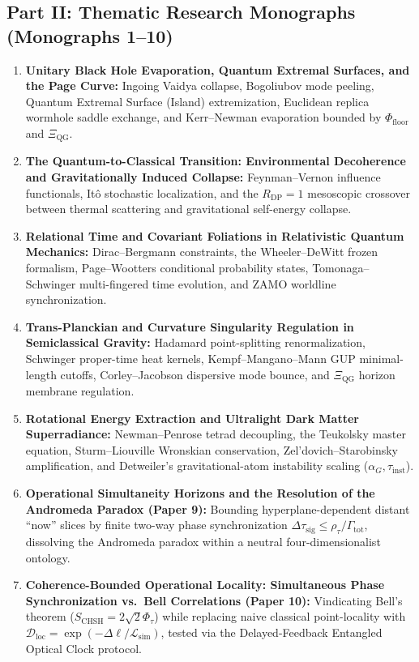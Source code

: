 \documentclass[11pt,a4paper]{article}
\begin{document}
\subsection*{Part II: Thematic Research Monographs (Monographs 1--10)}
\begin{enumerate}[label=\textbf{\arabic*.}]
    \item \textbf{Unitary Black Hole Evaporation, Quantum Extremal Surfaces, and the Page Curve:} Ingoing Vaidya collapse, Bogoliubov mode peeling, Quantum Extremal Surface (Island) extremization, Euclidean replica wormhole saddle exchange, and Kerr--Newman evaporation bounded by $\Phi_{\mathrm{floor}}$ and $\Xi_{\mathrm{QG}}$.
    \item \textbf{The Quantum-to-Classical Transition: Environmental Decoherence and Gravitationally Induced Collapse:} Feynman--Vernon influence functionals, Itô stochastic localization, and the $R_{\mathrm{DP}} = 1$ mesoscopic crossover between thermal scattering and gravitational self-energy collapse.
    \item \textbf{Relational Time and Covariant Foliations in Relativistic Quantum Mechanics:} Dirac--Bergmann constraints, the Wheeler--DeWitt frozen formalism, Page--Wootters conditional probability states, Tomonaga--Schwinger multi-fingered time evolution, and ZAMO worldline synchronization.
    \item \textbf{Trans-Planckian and Curvature Singularity Regulation in Semiclassical Gravity:} Hadamard point-splitting renormalization, Schwinger proper-time heat kernels, Kempf--Mangano--Mann GUP minimal-length cutoffs, Corley--Jacobson dispersive mode bounce, and $\Xi_{\mathrm{QG}}$ horizon membrane regulation.
    \item \textbf{Rotational Energy Extraction and Ultralight Dark Matter Superradiance:} Newman--Penrose tetrad decoupling, the Teukolsky master equation, Sturm--Liouville Wronskian conservation, Zel'dovich--Starobinsky amplification, and Detweiler's gravitational-atom instability scaling ($\alpha_G, \tau_{\mathrm{inst}}$).
    \item \textbf{Operational Simultaneity Horizons and the Resolution of the Andromeda Paradox (Paper 9):} Bounding hyperplane-dependent distant ``now'' slices by finite two-way phase synchronization $\Delta\tau_{\mathrm{sig}} \leq \rho_\tau / \Gamma_{\mathrm{tot}}$, dissolving the Andromeda paradox within a neutral four-dimensionalist ontology.
    \item \textbf{Coherence-Bounded Operational Locality: Simultaneous Phase Synchronization vs.\ Bell Correlations (Paper 10):} Vindicating Bell's theorem ($S_{\mathrm{CHSH}} = 2\sqrt{2}\Phi_\tau$) while replacing naive classical point-locality with $\mathcal{D}_{\mathrm{loc}} = \exp(-\Delta\ell/\mathcal{L}_{\mathrm{sim}})$, tested via the Delayed-Feedback Entangled Optical Clock protocol.

\end{enumerate}
\end{document}
